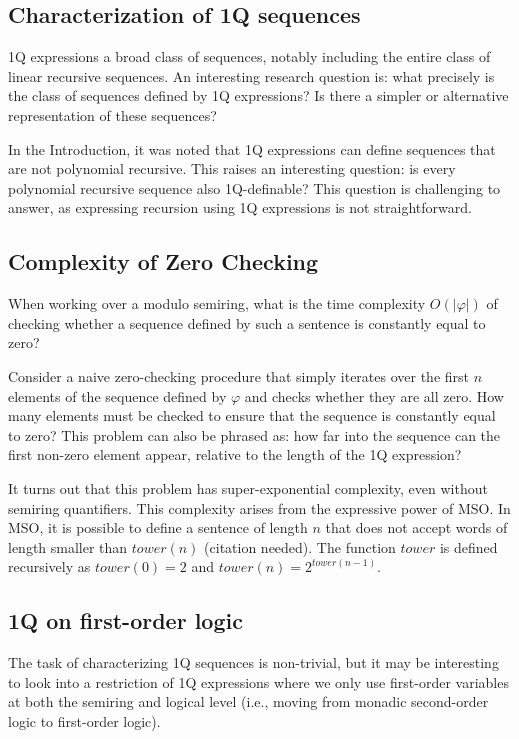 \documentclass[12pt]{article}
\theoremstyle{definition}
\begin{document}
\subsection*{Characterization of 1Q sequences}
\label{CharacterizationOf1QSequences}
1Q expressions a broad class of sequences, notably including the entire class of linear recursive sequences. An interesting research question is: what precisely is the class of sequences defined by 1Q expressions? Is there a simpler or alternative representation of these sequences?

In the Introduction, it was noted that 1Q expressions can define sequences that are not polynomial recursive. This raises an interesting question: is every polynomial recursive sequence also 1Q-definable? This question is challenging to answer, as expressing recursion using 1Q expressions is not straightforward.

\subsection*{Complexity of Zero Checking}
When working over a modulo semiring, what is the time complexity $O(|\varphi|)$ of checking whether a sequence defined by such a sentence is constantly equal to zero?

Consider a naive zero-checking procedure that simply iterates over the first $n$ elements of the sequence defined by $\varphi$ and checks whether they are all zero. How many elements must be checked to ensure that the sequence is constantly equal to zero? This problem can also be phrased as: how far into the sequence can the first non-zero element appear, relative to the length of the 1Q expression?

It turns out that this problem has super-exponential complexity, even without semiring quantifiers. This complexity arises from the expressive power of MSO. In MSO, it is possible to define a sentence of length $n$ that does not accept words of length smaller than $tower(n)$ (citation needed). The function $tower$ is defined recursively as $tower(0) = 2$ and $tower(n) = 2^{tower(n-1)}$.

\subsection*{1Q on first-order logic}
The task of characterizing 1Q sequences is non-trivial, but it may be interesting to look into a restriction of 1Q expressions where we only use first-order variables at both the semiring and logical level (i.e., moving from monadic second-order logic to first-order logic).
\end{document}
